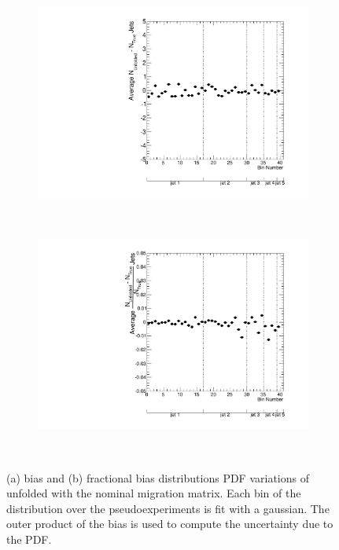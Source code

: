 \begin{figure}
\begin{subfigure}[]{0.45\textwidth}
\includegraphics[width=\textwidth]{fig/PDF/AvgBias.pdf}
\end{subfigure}
~
\begin{subfigure}[]{0.45\textwidth}
\includegraphics[width=\textwidth]{fig/PDF/AvgFracBias.pdf}
\end{subfigure}
~
\label{fig:pdfbias}
\caption{
(a) bias and (b) fractional bias distributions PDF variations of \mcnlohw unfolded with the nominal \mcnlohw migration matrix. Each bin of the distribution over the pseudoexperiments is fit with a gaussian. The outer product of the bias is used to compute the uncertainty due to the PDF.}
\end{figure}


